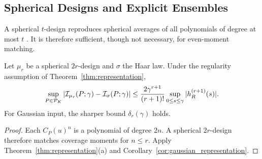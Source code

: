 \subsection{Spherical Designs and Explicit Ensembles}
A spherical $t$-design reproduces spherical averages of all polynomials of degree at most $t$ \cite{delsarte1977}. It is therefore sufficient, though not necessary, for even-moment matching.
\begin{corollary}\label{cor:design}
Let $\mu_r$ be a spherical $2r$-design and $\sigma$ the Haar law. Under the regularity assumption of Theorem~\ref{thm:representation},
\begin{equation}
\sup_{P\in\mathcal P_K}|\mathcal I_{\mu_r}(P;\gamma)-\mathcal I_\sigma(P;\gamma)|
\le\frac{2\gamma^{r+1}}{(r+1)!}\sup_{0\le s\le\gamma}|h_R^{(r+1)}(s)|.
\label{eq:design_bound}
\end{equation}
For Gaussian input, the sharper bound $\delta_r(\gamma)$ holds.
\end{corollary}
\begin{proof}
Each $C_P(u)^n$ is a polynomial of degree $2n$. A spherical $2r$-design therefore matches coverage moments for $n\le r$. Apply Theorem~\ref{thm:representation}(a) and Corollary~\ref{cor:gaussian_representation}.
\end{proof}
